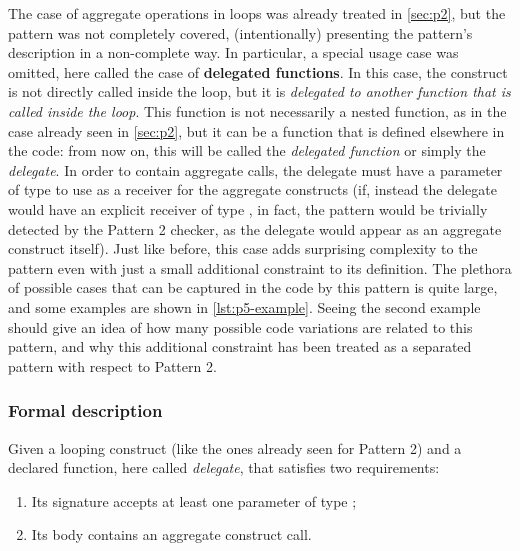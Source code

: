 \documentclass[12pt,a4paper,openright,twoside]{book}
\begin{document}
The case of aggregate operations in loops was already treated in \cref{sec:p2},
but the pattern was not completely covered, (intentionally) presenting the
pattern's description in a non-complete way. In particular, a special usage
case was omitted, here called the case of \textbf{delegated functions}. 
%
In this case, the construct is not directly called inside the loop, but it is
\emph{delegated to another function that is called inside the loop}. This
function is not necessarily a nested function, as in the case already seen in
\cref{sec:p2}, but it can be a function that is defined elsewhere in the code:
from now on, this will be called the \emph{delegated function} or simply the
\emph{delegate}. In order to contain aggregate calls, the delegate must have a
parameter of type  to use as a receiver for the aggregate
constructs (if, instead the delegate would have an explicit receiver of type
, in fact, the pattern would be trivially detected by the
Pattern 2 checker, as the delegate would appear as an aggregate construct
itself).
%
Just like before, this case adds surprising complexity to the pattern even with
just a small additional constraint to its definition. The plethora of possible
cases that can be captured in the code by this pattern is quite large, and some
examples are shown in \cref{lst:p5-example}. Seeing the second example should
give an idea of how many possible code variations are related to this pattern,
and why this additional constraint has been treated as a separated pattern with
respect to Pattern 2.



\subsubsection{Formal description}

Given a looping construct (like the ones already seen for Pattern 2) and a
declared function, here called \emph{delegate}, that satisfies two requirements:
\begin{enumerate}
  \item Its signature accepts at least one parameter of type ;
  \item Its body contains an aggregate construct call.
\end{enumerate}
\end{document}
